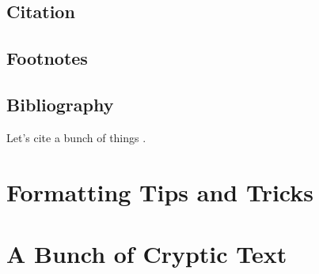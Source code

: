 \documentclass[master]{thesis}
\begin{document}
\section{Citation}

\section{Footnotes}

\section{Bibliography}

Let's cite a bunch of things \cite{forney20112749, cebl, forney2011thesis, forney2015echostate, haykin2009neural}.

\chapter{Formatting Tips and Tricks}

\appendix %

\chapter{A Bunch of Cryptic Text}
\label{appendix:cryptic}
\lipsum

\backmatter %




\end{document}
